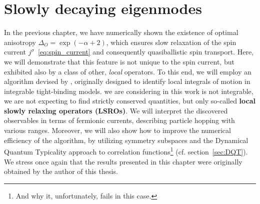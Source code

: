 \chapter{Slowly decaying eigenmodes\label{chap:currents}}
\thispagestyle{chapterBeginStyle}

In the previous chapter, we have numerically shown the existence of optimal anisotropy
\(\Delta_{O} = \exp(- \alpha + 2)\), which ensures slow relaxation of the spin current
\(j^{\sigma}\)~\eqref{eq:spin_current} and consequently quasiballistic spin transport.
Here, we will demonstrate that this feature is not unique to the spin current, but
exhibited also by a class of other, \textit{local} operators. To this end, we will
employ an algorithm devised by \textcite{Mierzejewski2015a}, originally designed to
identify local integrals of motion in integrable tight-binding models.
we are considering in this work is not integrable, we are not expecting to find
strictly conserved quantities, but only so-called \textbf{local slowly relaxing
  operators (LSROs)}. We will interpret the discovered observables in terms of
fermionic currents, describing particle hopping with various ranges.
Moreover, we will also show how to improve the numerical efficiency of
the algorithm, by utilizing symmetry subspaces and the Dynamical Quantum Typicality
approach to correlation functions\footnote{And why it, unfortunately, fails in this case.}
(cf. section~\ref{sec:DQT}). We stress once again that the results presented in this
chapter were originally obtained by the author of this thesis.

